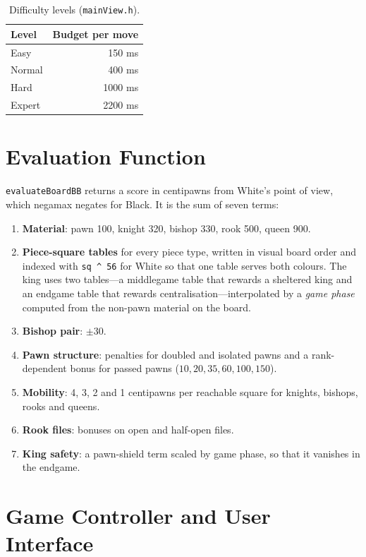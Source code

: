 \documentclass[conference]{IEEEtran}
\begin{document}
\begin{table}[t]
\caption{Difficulty levels (\texttt{mainView.h}).}
\label{tab:levels}
\centering
\begin{tabular}{@{}lr@{}}
\toprule
Level & Budget per move \\
\midrule
Easy & 150 ms \\
Normal & 400 ms \\
Hard & 1000 ms \\
Expert & 2200 ms \\
\bottomrule
\end{tabular}
\end{table}

\section{Evaluation Function}
\texttt{evaluateBoardBB} returns a score in centipawns from White's point of view, which negamax negates for Black. It is the sum of seven terms:
\begin{enumerate}
  \item \textbf{Material}: pawn 100, knight 320, bishop 330, rook 500, queen 900.
  \item \textbf{Piece-square tables} for every piece type, written in visual board order and indexed with \texttt{sq \^{} 56} for White so that one table serves both colours. The king uses two tables---a middlegame table that rewards a sheltered king and an endgame table that rewards centralisation---interpolated by a \emph{game phase} computed from the non-pawn material on the board.
  \item \textbf{Bishop pair}: $\pm30$.
  \item \textbf{Pawn structure}: penalties for doubled and isolated pawns and a rank-dependent bonus for passed pawns ($10,20,35,60,100,150$).
  \item \textbf{Mobility}: 4, 3, 2 and 1 centipawns per reachable square for knights, bishops, rooks and queens.
  \item \textbf{Rook files}: bonuses on open and half-open files.
  \item \textbf{King safety}: a pawn-shield term scaled by game phase, so that it vanishes in the endgame.
\end{enumerate}

\section{Game Controller and User Interface}
\end{document}
